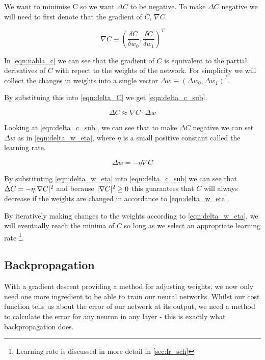 We want to minimise C so we want $\Delta C$ to be negative. To make $\Delta C$ negative we will need to first denote that the gradient of $C$, $\nabla C$. 

\begin{equation} \label{eqn:nabla_c}
\nabla C \equiv (\frac{\delta C}{\delta w_0}, \frac{\delta C}{\delta w_1})^T
\end{equation}

In \autoref{eqn:nabla_c} we can see that the gradient of $C$ is equivalent to the partial derivatives of $C$ with repect to the weights of the network. For simplicity we will collect the changes in weights into a single vector $\Delta w \equiv (\Delta w_0, \Delta w_1)^T$.

By substituing this into \autoref{eqn:delta_C} we get \autoref{eqn:delta_c_sub}.

\begin{equation} \label{eqn:delta_c_sub}
\Delta C \approx \nabla C \cdot \Delta w 
\end{equation}

Looking at \autoref{eqn:delta_c_sub}, we can see that to make $\Delta C$ negative we can set $\Delta w$ as in \autoref{eqn:delta_w_eta}, where $\eta$ is a small positive constant called the learning rate.

\begin{equation} \label{eqn:delta_w_eta}
\Delta w = -\eta \nabla C
\end{equation}

By substituting \autoref{eqn:delta_w_eta} into \autoref{eqn:delta_c_sub} we can see that $ \Delta C = - \eta \lvert\nabla C\rvert^2$ and because $\lvert\nabla C\rvert^2 \geq 0$ this guarantees that $C$ will always decrease if the weights are changed in accordance to \autoref{eqn:delta_w_eta}.

By iteratively making changes to the weights according to \autoref{eqn:delta_w_eta}, we will eventually reach the minima of $C$ so long as we select an appropriate learning rate \footnote{Learning rate is discussed in more detail in \autoref{sec:lr_sch}}. 

\subsection{Backpropagation}
With a gradient descent providing a method for adjusting  weights, we now only need one more ingredient to be able to train our neural networks. Whilst our cost function tells us about the error of our network at its output, we need a method to calculate the error for any neuron in any layer - this is exactly what backpropagation does. 

